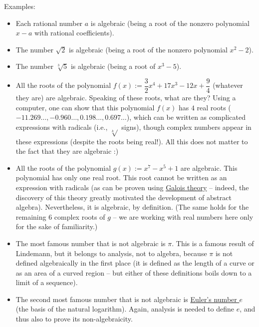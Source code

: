\documentclass[numbers=enddot,12pt,final,onecolumn,notitlepage]{scrartcl}%
\numberwithin{exer}{subsection}
\theoremstyle{definition}
\begin{document}
Examples:

\begin{itemize}
\item Each rational number $a$ is algebraic (being a root of the nonzero
polynomial $x-a$ with rational coefficients).

\item The number $\sqrt{2}$ is algebraic (being a root of the nonzero
polynomial $x^{2}-2$).

\item The number $\sqrt[3]{5}$ is algebraic (being a root of $x^{3}-5$).

\item All the roots of the polynomial $f\left(  x \right)  := \dfrac{3}%
{2}x^{4}+17x^{3}-12x+\dfrac{9}{4}$ (whatever they are) are algebraic. \newline
Speaking of these roots, what are they? Using a computer, one can show that
this polynomial $f\left(  x \right)  $ has $4$ real roots ($-11.269\ldots,
-0.960\ldots, 0.198\ldots, 0.697\ldots$), which can be written as complicated
expressions with radicals (i.e., $\sqrt[k]{}$ signs), though complex numbers
appear in these expressions (despite the roots being real!). All this does not
matter to the fact that they are algebraic :)

\item All the roots of the polynomial $g\left(  x \right)  := x^{7} - x^{5} +
1$ are algebraic. \newline This polynomial has only one real root. This root
cannot be written as an expression with radicals (as can be proven using
\href{https://en.wikipedia.org/wiki/Galois_theory}{Galois theory} -- indeed,
the discovery of this theory greatly motivated the development of abstract
algebra).
Nevertheless, it is algebraic, by definition. (The same holds for the
remaining $6$ complex roots of $g$ -- we are working with real numbers here
only for the sake of familiarity.)

\item The most famous number that is not algebraic is $\pi$. This is a famous
result of Lindemann, but it belongs to analysis, not to algebra, because $\pi$
is not defined algebraically in the first place (it is defined as the length
of a curve or as an area of a curved region -- but either of these definitions
boils down to a limit of a sequence).

\item The second most famous number that is not algebraic is
\href{https://en.wikipedia.org/wiki/E_(mathematical_constant)}{Euler's number
$e$} (the basis of the natural logarithm). Again, analysis is needed to define
$e$, and thus also to prove its non-algebraicity.
\end{itemize}
\end{document}
